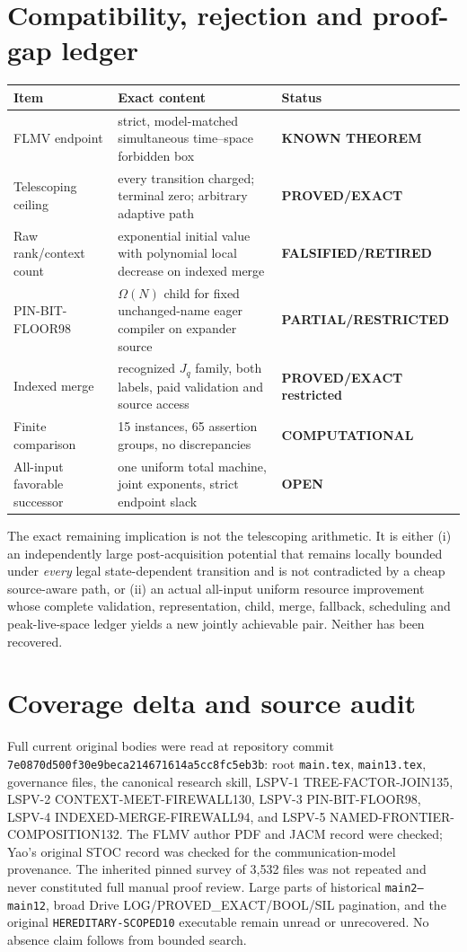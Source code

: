 \documentclass[11pt]{article}
\newcommand{\OPEN}{\textbf{OPEN}}
\begin{document}
\section{Compatibility, rejection and proof-gap ledger}
\begin{center}\small
\begin{tabular}{p{.19\linewidth}p{.48\linewidth}p{.22\linewidth}}
\toprule
Item & Exact content & Status\\\midrule
FLMV endpoint & strict, model-matched simultaneous time--space forbidden box
& \textbf{KNOWN THEOREM}\\
Telescoping ceiling & every transition charged; terminal zero; arbitrary
adaptive path & \textbf{PROVED/EXACT}\\
Raw rank/context count & exponential initial value with polynomial local
decrease on indexed merge & \textbf{FALSIFIED/RETIRED}\\
PIN-BIT-FLOOR98 & $\Omega(N)$ child for fixed unchanged-name eager compiler
on expander source & \textbf{PARTIAL/RESTRICTED}\\
Indexed merge & recognized $J_q$ family, both labels, paid validation and
source access & \textbf{PROVED/EXACT restricted}\\
Finite comparison & 15 instances, 65 assertion groups, no discrepancies
& \textbf{COMPUTATIONAL}\\
All-input favorable successor & one uniform total machine, joint exponents,
strict endpoint slack & \OPEN\\
\bottomrule
\end{tabular}
\end{center}

The exact remaining implication is not the telescoping arithmetic.  It is
either (i) an independently large post-acquisition potential that remains
locally bounded under \emph{every} legal state-dependent transition and is
not contradicted by a cheap source-aware path, or (ii) an actual all-input
uniform resource improvement whose complete validation, representation,
child, merge, fallback, scheduling and peak-live-space ledger yields a new
jointly achievable pair.  Neither has been recovered.

\section{Coverage delta and source audit}
Full current original bodies were read at repository commit
\texttt{7e0870d500f30e9beca214671614a5cc8fc5eb3b}: root
\texttt{main.tex}, \texttt{main13.tex}, governance files, the canonical
research skill, LSPV-1 TREE-FACTOR-JOIN135, LSPV-2
CONTEXT-MEET-FIREWALL130, LSPV-3 PIN-BIT-FLOOR98, LSPV-4
INDEXED-MERGE-FIREWALL94, and LSPV-5 NAMED-FRONTIER-COMPOSITION132.
The FLMV author PDF and JACM record were checked; Yao's original STOC record
was checked for the communication-model provenance.  The inherited pinned
survey of 3,532 files was not repeated and never constituted full manual
proof review.  Large parts of historical \texttt{main2--main12}, broad Drive
LOG/PROVED\_EXACT/BOOL/SIL pagination, and the original
\texttt{HEREDITARY-SCOPED10} executable remain unread or unrecovered.  No
absence claim follows from bounded search.
\end{document}
